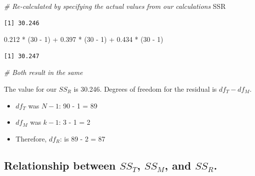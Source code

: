 \documentclass[
  11pt,
]{book}
\newenvironment{Shaded}{\begin{snugshade}}{\end{snugshade}}
\newcommand{\CommentTok}[1]{\textcolor[rgb]{0.56,0.35,0.01}{\textit{#1}}}
\newcommand{\DecValTok}[1]{\textcolor[rgb]{0.00,0.00,0.81}{#1}}
\newcommand{\FloatTok}[1]{\textcolor[rgb]{0.00,0.00,0.81}{#1}}
\newcommand{\NormalTok}[1]{#1}
\newcommand{\SpecialCharTok}[1]{\textcolor[rgb]{0.00,0.00,0.00}{#1}}
\providecommand{\tightlist}{%
  \setlength{\itemsep}{0pt}\setlength{\parskip}{0pt}}
\begin{document}
\begin{Shaded}
\begin{Highlighting}[]
\CommentTok{\# Re{-}calculated by specifying the actual values from our calculations}
\NormalTok{SSR}
\end{Highlighting}
\end{Shaded}

\begin{verbatim}
[1] 30.246
\end{verbatim}

\begin{Shaded}
\begin{Highlighting}[]
\FloatTok{0.212} \SpecialCharTok{*}\NormalTok{ (}\DecValTok{30} \SpecialCharTok{{-}} \DecValTok{1}\NormalTok{) }\SpecialCharTok{+} \FloatTok{0.397} \SpecialCharTok{*}\NormalTok{ (}\DecValTok{30} \SpecialCharTok{{-}} \DecValTok{1}\NormalTok{) }\SpecialCharTok{+} \FloatTok{0.434} \SpecialCharTok{*}\NormalTok{ (}\DecValTok{30} \SpecialCharTok{{-}} \DecValTok{1}\NormalTok{)}
\end{Highlighting}
\end{Shaded}

\begin{verbatim}
[1] 30.247
\end{verbatim}

\begin{Shaded}
\begin{Highlighting}[]
\CommentTok{\# Both result in the same}
\end{Highlighting}
\end{Shaded}

The value for our \(SS_R\) is 30.246. Degrees of freedom for the residual is \(df_T - df_M\).

\begin{itemize}
\tightlist
\item
  \(df_T\) was \(N-1\): 90 - 1 = 89
\item
  \(df_M\) was \(k - 1\): 3 - 1 = 2
\item
  Therefore, \(df_R\): is 89 - 2 = 87
\end{itemize}

\hypertarget{relationship-between-ss_t-ss_m-and-ss_r.}{%
\subsection{\texorpdfstring{Relationship between \(SS_T\), \(SS_M\), and \(SS_R\).}{Relationship between SS\_T, SS\_M, and SS\_R.}}\label{relationship-between-ss_t-ss_m-and-ss_r.}}
\end{document}
